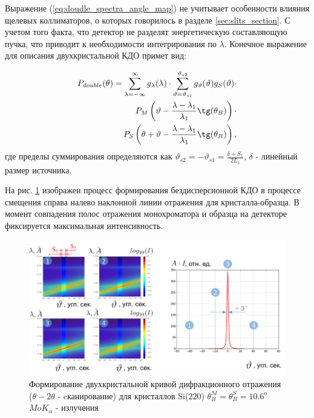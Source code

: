 Выражение (\ref{eq:doudle_spectra_angle_map}) не учитывает особенности влияния
 щелевых коллиматоров, о которых говорилось в
разделе \ref{sec:slits_section}. С учетом того факта, что детектор не разделят
 энергетическую составляющую пучка, что приводит к необходимости интегрирования по $\lambda$.
Конечное выражение для описания двухкристальной КДО примет вид:

\begin{eqnarray} \label{eq:doudle_spectra_angle_map_on_detector}
  P_{double}(\theta) = \sum_{\lambda = -\infty}^{\infty}g_{\lambda}(\lambda)\cdot
  \sum_{\vartheta = \vartheta_{s1}}^{\vartheta_{s2}} g_{\vartheta}(\vartheta) g_{S}(\vartheta) \cdot \nonumber \\
   P_M \left(\vartheta - \frac{\lambda - \lambda_1}{\lambda_1}\tg(\theta_B) \right) \cdot \nonumber \\
   P_S \left(\theta + \vartheta - \frac{\lambda - \lambda_1}{\lambda_1}\tg(\theta_B)\right),
 \end{eqnarray}
 \noindent
 где пределы суммирования определяются как $\vartheta_{s2} = - \vartheta_{s1} = \frac{\delta+S_1}{2L_1}$,
 $\delta$ - линейный размер источника.

 На рис. \ref{ris:double_crystal_form_kdo} изображен процесс формирования
 бездисперсионной КДО в процессе смещения справа налево наклонной линии отражения
 для кристалла-образца. В момент совпадения полос отражения монохроматора и образца
 на детекторе фиксируется максимальная интенсивность.

 \begin{figure}[H]
   \centering
   \includegraphics[width=1\textwidth]{images/double_crystal_form_kdo.png}
   \caption{Формирование двухкристальной кривой дифракционного отражения
    ($\theta - 2\theta$ - cканирование) для кристаллов Si(220)
   $\theta_B^M = \theta_B^S = 10.6^o$  $MoK_{\alpha}$ - излучения}
   \label{ris:double_crystal_form_kdo}
 \end{figure}

